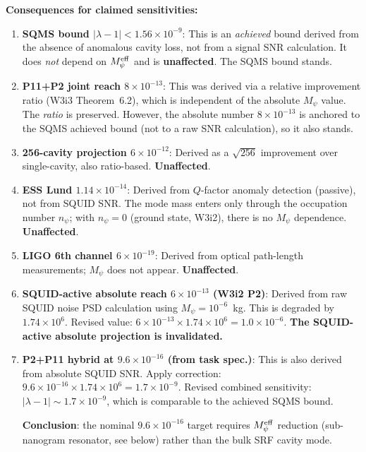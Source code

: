 \documentclass[11pt,twocolumn]{article}
\newcommand{\lam}{\lambda}
\newcommand{\Mpsi}{M_\psi}
\newcommand{\Meff}{M_\psi^{\rm eff}}
\newcommand{\ee}[1]{\times 10^{#1}}
\begin{document}
\begin{tcolorbox}[colback=red!5!white, colframe=red!50!black, title=Priority~1 Resolution: Revised Sensitivity Landscape]
\textbf{Consequences for claimed sensitivities:}
\begin{enumerate}[nosep]
\item \textbf{SQMS bound $|\lam-1| < 1.56\ee{-9}$}: This is an \emph{achieved}
  bound derived from the absence of anomalous cavity loss, not from a
  signal SNR calculation. It does \emph{not} depend on $\Meff$ and is
  \textbf{unaffected}. The SQMS bound stands.

\item \textbf{P11+P2 joint reach $8\ee{-13}$}: This was derived via a
  relative improvement ratio (W3i3 Theorem~6.2), which is independent
  of the absolute $\Mpsi$ value. The \emph{ratio} is preserved.
  However, the absolute number $8\ee{-13}$ is anchored to the SQMS
  achieved bound (not to a raw SNR calculation), so it also stands.

\item \textbf{256-cavity projection $6\ee{-12}$}: Derived as a $\sqrt{256}$
  improvement over single-cavity, also ratio-based. \textbf{Unaffected}.

\item \textbf{ESS Lund $1.14\ee{-14}$}: Derived from $Q$-factor anomaly
  detection (passive), not from SQUID SNR. The mode mass enters only
  through the occupation number $n_\psi$; with $n_\psi = 0$ (ground
  state, W3i2), there is no $\Mpsi$ dependence.  \textbf{Unaffected}.

\item \textbf{LIGO 6th channel $6\ee{-19}$}: Derived from optical path-length
  measurements; $\Mpsi$ does not appear. \textbf{Unaffected}.

\item \textbf{SQUID-active absolute reach $6\ee{-13}$ (W3i2 P2)}: Derived
  from raw SQUID noise PSD calculation using $\Mpsi = 10^{-6}$~kg.
  This is degraded by $1.74\ee{6}$. Revised value:
  $6\ee{-13}\times1.74\ee{6} = 1.0\ee{-6}$.
  \textbf{The SQUID-active absolute projection is invalidated.}

\item \textbf{P2+P11 hybrid at $9.6\ee{-16}$ (from task spec.)}: This is
  also derived from absolute SQUID SNR. Apply correction:
  $9.6\ee{-16}\times1.74\ee{6} = 1.7\ee{-9}$.
  Revised combined sensitivity: $|\lam-1| \sim 1.7\ee{-9}$, which
  is comparable to the achieved SQMS bound.

  \textbf{Conclusion}: the nominal $9.6\ee{-16}$ target requires
  $\Meff$ reduction (sub-nanogram resonator, see below) rather than
  the bulk SRF cavity mode.
\end{enumerate}
\end{tcolorbox}
\end{document}
